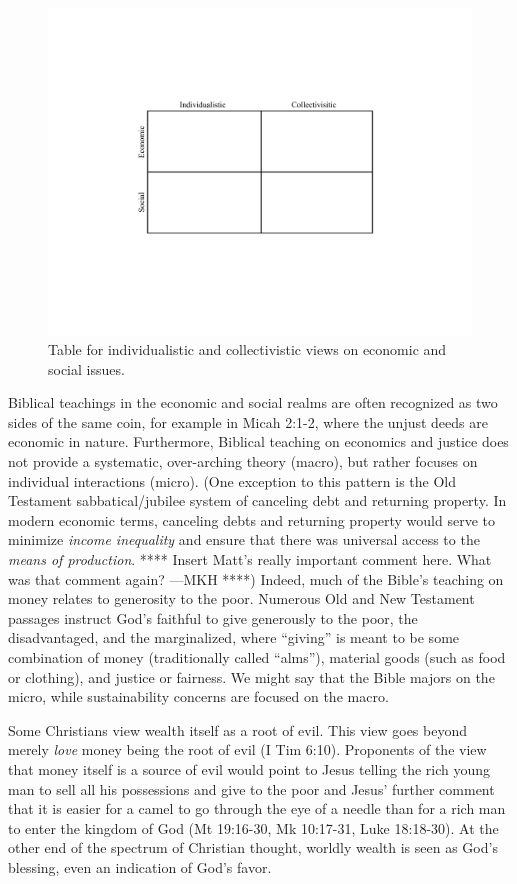 \documentclass[12pt]{article}
\begin{document}
\begin{figure}
\centering
\includegraphics[width=0.75\linewidth]{figure_other/QuadTable}
\caption{Table for individualistic and collectivistic views on economic and social issues.}
\label{fig:table}
\end{figure}

Biblical teachings in the economic and social realms are often recognized 
as two sides of the same coin, 
for example in Micah 2:1-2, 
where the unjust deeds are economic in nature. 
Furthermore, Biblical teaching on economics and justice does not provide a
systematic, over-arching theory (macro),
but rather focuses on individual interactions (micro).
(One exception to this pattern is the Old Testament sabbatical/jubilee system 
of canceling debt and returning property.
In modern economic terms, canceling debts and returning property would serve to minimize 
\emph{income inequality} and ensure that there was universal access to the \emph{means of production}.
**** Insert Matt's really important comment here.
What was that comment again? ---MKH ****)
Indeed, much of the Bible's
teaching on money relates to generosity to the poor. 
Numerous Old and New Testament passages instruct God's faithful to
give generously to the poor, the disadvantaged, and the marginalized, 
where ``giving'' is meant to be some combination of 
money (traditionally called ``alms''), 
material goods (such as food or clothing), and 
justice or fairness.
We might say that the Bible majors on the micro,
while sustainability concerns are focused on the macro.

Some Christians view wealth itself as a root of evil. 
This view goes beyond merely \emph{love} money
being the root of evil (I Tim 6:10). 
Proponents of the view that money itself is a source of evil would point to Jesus
telling the rich young man to sell all his possessions and give to the poor and 
Jesus' further comment that it is easier
for a camel to go through the eye of a needle than 
for a rich man to enter the kingdom of God (Mt 19:16-30, Mk 10:17-31, Luke 18:18-30). 
At the other end of the spectrum of Christian thought, 
worldly wealth is seen as God's blessing, 
even an indication of God's favor.
\end{document}
